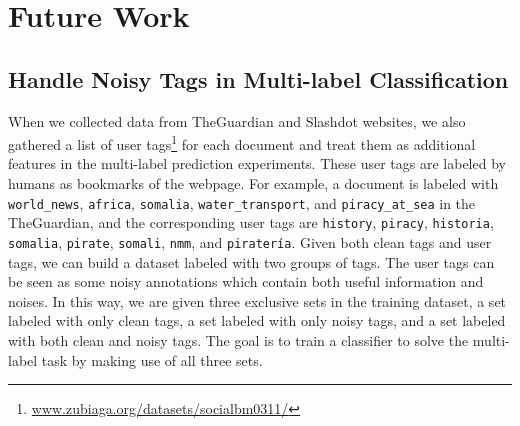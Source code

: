 \section{Future Work}


    
\subsection{Handle Noisy Tags in Multi-label Classification}  \label{future_noise}

When we collected data from TheGuardian and Slashdot websites, we also gathered a list of user tags\footnote{\scriptsize\url{www.zubiaga.org/datasets/socialbm0311/}} for each document and treat them as additional features in the multi-label prediction experiments. These user tags are labeled by humans as bookmarks of the webpage. For example, a document is labeled with \texttt{world\_news}, \texttt{africa}, \texttt{somalia}, \texttt{water\_transport}, and \texttt{piracy\_at\_sea} in the TheGuardian, and the corresponding user tags are \texttt{history}, \texttt{piracy}, \texttt{historia}, \texttt{somalia}, \texttt{pirate}, \texttt{somali}, \texttt{nmm}, and \texttt{piratería}. Given both clean tags and user tags, we can build a dataset labeled with two groups of tags. The user tags can be seen as some noisy annotations which contain both useful information and noises. In this way, we are given three exclusive sets in the training dataset, a set labeled with only clean tags, a set labeled with only noisy tags, and a set labeled with both clean and noisy tags. The goal is to train a classifier to solve the multi-label task by making use of all three sets.

